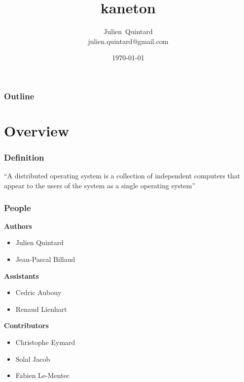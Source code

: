 \documentclass[8pt]{beamer}
\title{kaneton}
\author
{
  Julien~Quintard\inst{1} \\
  {\tiny julien.quintard@gmail.com}
}
\institute
{
  \inst{1} kaneton microkernel project
}
\date{\today}
\newcommand{\nl}[0]{\vspace{0.4cm}}
\begin{document}
%
%

\begin{frame}
  \titlepage

  \begin{center}
     \hspace{0.1cm}  \hspace{0.1cm}
     \hspace{0.1cm}
  \end{center}
\end{frame}

%
%

\begin{frame}
  \frametitle{Outline}
  \tableofcontents
\end{frame}

%
%

\section{Overview}


\begin{frame}
  \frametitle{Definition}

  ``A distributed operating system is a collection of independent
  computers that appear to the users of the system as a single operating
  system''
\end{frame}


\begin{frame}
  \frametitle{People}

  \textbf{Authors}

  \begin{itemize}
    \item
      Julien Quintard
    \item
      Jean-Pascal Billaud
  \end{itemize}

  \nl

  \textbf{Assistants}

  \begin{itemize}
    \item
      Cedric Aubouy
    \item
      Renaud Lienhart
  \end{itemize}

  \nl

  \textbf{Contributors}

  \begin{itemize}
    \item
      Christophe Eymard
    \item
      Solal Jacob
    \item
      Fabien Le-Mentec
  \end{itemize}
\end{frame}
\end{document}
